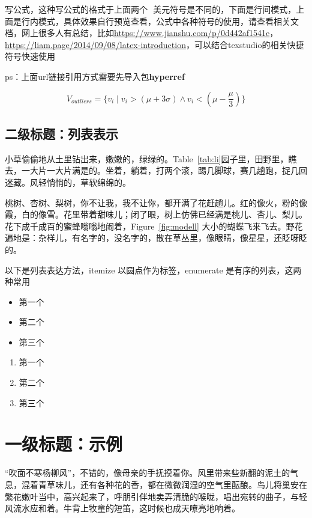 \documentclass[UTF8]{ctexart}
\begin{document}
写公式，这种写公式的格式于上面两个 $  $ 美元符号是不同的，下面是行间模式，上面是行内模式，具体效果自行预览查看，公式中各种符号的使用，请查看相关文档，网上很多人有总结，比如\url{https://www.jianshu.com/p/0d442af1541e}，\url{https://liam.page/2014/09/08/latex-introduction}，可以结合texstudio的相关快捷符号快速使用

ps：上面url链接引用方式需要先导入包\textbf{hyperref}

\begin{equation}
	\label{eqa:xli} %
	V_{outliers}=\{v_i \mid v_i>(\mu +3\sigma) \land v_i<(\mu -\frac{\mu}{3})\}
\end{equation}



\subsection{二级标题：列表表示}

小草偷偷地从土里钻出来，嫩嫩的，绿绿的。Table~\ref{tab:li}园子里，田野里，瞧去，一大片一大片满是的。坐着，躺着，打两个滚，踢几脚球，赛几趟跑，捉几回迷藏。风轻悄悄的，草软绵绵的。

桃树、杏树、梨树，你不让我，我不让你，都开满了花赶趟儿。红的像火，粉的像霞，白的像雪。花里带着甜味儿；闭了眼，树上仿佛已经满是桃儿、杏儿、梨儿。花下成千成百的蜜蜂嗡嗡地闹着，Figure~\ref{fig:modell} 大小的蝴蝶飞来飞去。野花遍地是：杂样儿，有名字的，没名字的，散在草丛里，像眼睛，像星星，还眨呀眨的。


以下是列表表达方法，itemize 以圆点作为标签，enumerate 是有序的列表，这两种常用
\begin{itemize}
	\item 第一个
	\item 第二个
	\item 第三个
\end{itemize}



\begin{enumerate}
	\item 第一个
	\item 第二个
	\item 第三个
\end{enumerate}


\section{一级标题：示例}

“吹面不寒杨柳风”，不错的，像母亲的手抚摸着你。风里带来些新翻的泥土的气息，混着青草味儿，还有各种花的香，都在微微润湿的空气里酝酿。鸟儿将巢安在繁花嫩叶当中，高兴起来了，呼朋引伴地卖弄清脆的喉咙，唱出宛转的曲子，与轻风流水应和着。牛背上牧童的短笛，这时候也成天嘹亮地响着。
\end{document}
